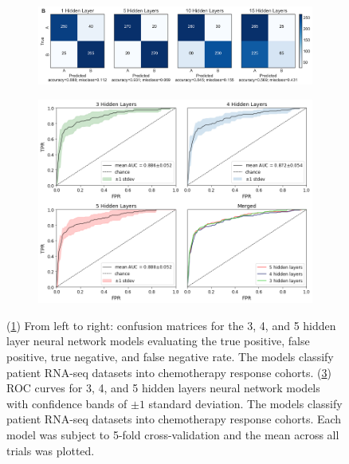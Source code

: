 \documentclass[10pt, letterpaper]{article}
\begin{document}
\begin{multicols}{2}
\begin{figure}[!ht]
    \centering
    \begin{subfigure}[t]{\textwidth}
        \centering
        \includegraphics[width=\textwidth]{Figures/confusion_matrix/cm_combined.png}
        \caption{}
        \label{fig:cms}
    \end{subfigure}

    \begin{subfigure}[t]{\textwidth}
        \centering
        \includegraphics[width=\textwidth]{Figures/roc/full_merged.png}
        \caption{}
        \label{fig:roc}
    \end{subfigure}

    \caption{(\ref{fig:cms}) From left to right: confusion matrices for the 3, 4, and 5 hidden layer neural network models evaluating the true positive, false positive, true negative, and false negative rate. The models classify patient RNA-seq datasets into chemotherapy response cohorts. (\ref{fig:roc}) ROC curves for 3, 4, and 5 hidden layers neural network models with confidence bands of $\pm 1$ standard deviation. The models classify patient RNA-seq datasets into chemotherapy response cohorts. Each model was subject to 5-fold cross-validation and the mean across all trials was plotted.}
\end{figure}



\end{multicols}
\end{document}
